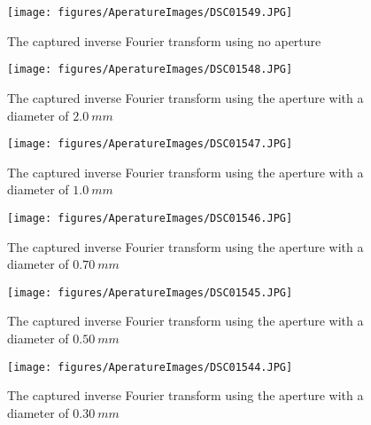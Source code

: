 \begin{figure}[H]
    \centering
    \begin{minipage}[t]{0.45\textwidth}
        \centering
        \texttt{[image: figures/AperatureImages/DSC01549.JPG]}
        \caption{The captured inverse Fourier transform using no aperture}
    \end{minipage}%
    \hspace{0.5cm}
    \begin{minipage}[t]{0.45\textwidth}
        \centering
        \texttt{[image: figures/AperatureImages/DSC01548.JPG]}
        \caption{The captured inverse Fourier transform using the aperture with a diameter of $2.0 \ \si{mm}$}
    \end{minipage}%
    \vspace{1.5cm}
    \begin{minipage}[t]{0.45\textwidth}
        \centering
        \texttt{[image: figures/AperatureImages/DSC01547.JPG]}
        \caption{The captured inverse Fourier transform using the aperture with a diameter of $1.0 \ \si{mm}$}
    \end{minipage}%
    \hspace{0.5cm}
    \begin{minipage}[t]{0.45\textwidth}
        \centering
        \texttt{[image: figures/AperatureImages/DSC01546.JPG]}
        \caption{The captured inverse Fourier transform using the aperture with a diameter of $0.70 \ \si{mm}$}
    \end{minipage}%
    \vspace{1.5cm}
    \begin{minipage}[t]{0.45\textwidth}
        \centering
        \texttt{[image: figures/AperatureImages/DSC01545.JPG]}
        \caption{The captured inverse Fourier transform using the aperture with a diameter of $0.50 \ \si{mm}$}
    \end{minipage}%
    \hspace{0.5cm}
    \begin{minipage}[t]{0.45\textwidth}
        \centering
        \texttt{[image: figures/AperatureImages/DSC01544.JPG]}
        \caption{The captured inverse Fourier transform using the aperture with a diameter of $0.30 \ \si{mm}$}
    \end{minipage}%
\end{figure}